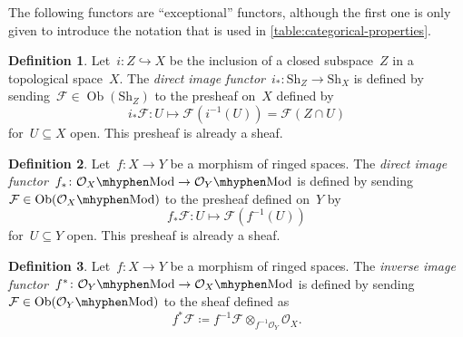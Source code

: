 \documentclass[a4paper,10pt]{article}
\theoremstyle{definition}
\newtheorem{definition}{Definition}
\newcommand\Sh{\ensuremath{\mathrm{Sh}}}
\DeclareMathOperator\Ob{Ob}
\begin{document}
The following functors are ``exceptional'' functors, although the first one is only given to introduce the notation that is used in \cref{table:categorical-properties}.
\begin{definition}
  Let~$i\colon Z\hookrightarrow X$ be the inclusion of a closed subspace~$Z$ in a topological space~$X$. The \emph{direct image functor}~$i_*\colon\Sh_Z\to\Sh_X$ is defined by sending~$\mathcal{F}\in\Ob(\Sh_Z)$ to the presheaf on~$X$ defined by
  \begin{equation}
    i_*\mathcal{F}\colon U\mapsto\mathcal{F}(i^{-1}(U))=\mathcal{F}(Z\cap U)
    \label{equation:direct-image-abelian-groups-closed-embedding}
  \end{equation}
  for~$U\subseteq X$ open. This presheaf is already a sheaf.
\end{definition}


\begin{definition}
  Let~$f\colon X\to Y$ be a morphism of ringed spaces. The \emph{direct image functor}~$f_*\colon\Mod{\mathcal{O}_X}\to\Mod{\mathcal{O}_Y}$ is defined by sending~$\mathcal{F}\in\Ob(\Mod{\mathcal{O}_X})$ to the presheaf defined on~$Y$ by
  \begin{equation}
    f_*\mathcal{F}\colon U\mapsto\mathcal{F}(f^{-1}(U))
    \label{equation:direct-image-O_X-modules}
  \end{equation}
  for~$U\subseteq Y$ open. This presheaf is already a sheaf.
\end{definition}

\begin{definition}
  Let~$f\colon X\to Y$ be a morphism of ringed spaces. The \emph{inverse image functor}~$f^*\colon\Mod{\mathcal{O}_Y}\to\Mod{\mathcal{O}_X}$ is defined by sending~$\mathcal{F}\in\Ob(\Mod{\mathcal{O}_Y})$ to the sheaf defined as
  \begin{equation}
    f^*\mathcal{F}\coloneqq f^{-1}\mathcal{F}\otimes_{f^{-1}\mathcal{O}_Y}\mathcal{O}_X.
    \label{equation:inverse-image-O_X-modules}
  \end{equation}
\end{definition}
\end{document}
